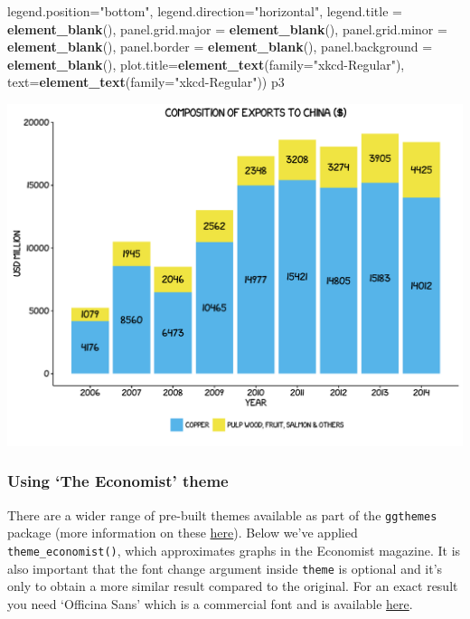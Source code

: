 \documentclass[]{article}
\newenvironment{Shaded}{\begin{snugshade}}{\end{snugshade}}
\newcommand{\KeywordTok}[1]{\textcolor[rgb]{0.13,0.29,0.53}{\textbf{{#1}}}}
\newcommand{\DataTypeTok}[1]{\textcolor[rgb]{0.13,0.29,0.53}{{#1}}}
\newcommand{\StringTok}[1]{\textcolor[rgb]{0.31,0.60,0.02}{{#1}}}
\newcommand{\NormalTok}[1]{{#1}}
\begin{document}
\begin{Shaded}
\begin{Highlighting}[]
        \DataTypeTok{legend.position=}\StringTok{"bottom"}\NormalTok{, }\DataTypeTok{legend.direction=}\StringTok{"horizontal"}\NormalTok{, }
        \DataTypeTok{legend.title =} \KeywordTok{element_blank}\NormalTok{(),}
        \DataTypeTok{panel.grid.major =} \KeywordTok{element_blank}\NormalTok{(),}
        \DataTypeTok{panel.grid.minor =} \KeywordTok{element_blank}\NormalTok{(), }\DataTypeTok{panel.border =} \KeywordTok{element_blank}\NormalTok{(), }
        \DataTypeTok{panel.background =} \KeywordTok{element_blank}\NormalTok{(),}
        \DataTypeTok{plot.title=}\KeywordTok{element_text}\NormalTok{(}\DataTypeTok{family=}\StringTok{"xkcd-Regular"}\NormalTok{), }\DataTypeTok{text=}\KeywordTok{element_text}\NormalTok{(}\DataTypeTok{family=}\StringTok{"xkcd-Regular"}\NormalTok{)) }
\NormalTok{p3}
\end{Highlighting}
\end{Shaded}

\begin{center}\includegraphics{0_all_posts_pdf/bar_10-1} \end{center}

\subsubsection{\texorpdfstring{Using `The Economist'
theme}{Using The Economist theme}}\label{using-the-economist-theme-2}

There are a wider range of pre-built themes available as part of the
\texttt{ggthemes} package (more information on these
\href{https://cran.r-project.org/web/packages/ggthemes/vignettes/ggthemes.html}{here}).
Below we've applied \texttt{theme\_economist()}, which approximates
graphs in the Economist magazine. It is also important that the font
change argument inside \texttt{theme} is optional and it's only to
obtain a more similar result compared to the original. For an exact
result you need `Officina Sans' which is a commercial font and is
available \href{http://www.myfonts.com/fonts/itc/officina-sans/}{here}.
\end{document}
